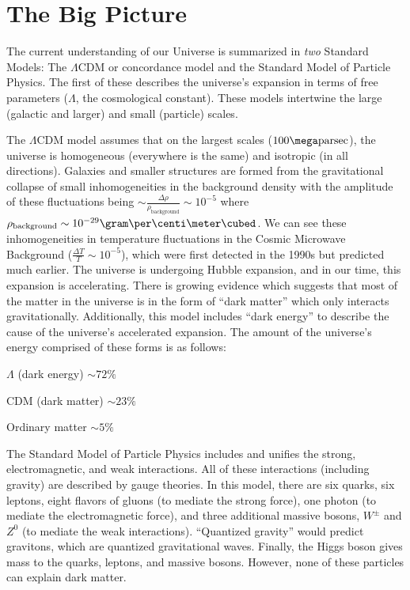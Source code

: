 \documentclass[a4paper,twoside,master.tex]{subfiles}
\begin{document}

\section{The Big Picture}\label{sec:the_big_picture}

The current understanding of our Universe is summarized in \textit{two} Standard Models: The $ \Lambda \text{CDM} $ or concordance model and the Standard Model of Particle Physics. The first of these describes the universe's expansion in terms of free parameters ($ \Lambda $, the cosmological constant). These models intertwine the large (galactic and larger) and small (particle) scales.

The $ \Lambda \text{CDM} $ model assumes that on the largest scales ($ 100\mega\text{parsec} $), the universe is homogeneous (everywhere is the same) and isotropic (in all directions). Galaxies and smaller structures are formed from the gravitational collapse of small inhomogeneities in the background density with the amplitude of these fluctuations being $ \sim \frac{\Delta \rho}{\rho_{\text{background}}} \sim 10^{-5} $ where $ \rho_{\text{background}} \sim 10^{-29} \gram\per\centi\meter\cubed $. We can see these inhomogeneities in temperature fluctuations in the Cosmic Microwave Background ($ \frac{\Delta T}{T} \sim 10^{-5} $), which were first detected in the 1990s but predicted much earlier. The universe is undergoing Hubble expansion, and in our time, this expansion is accelerating. There is growing evidence which suggests that most of the matter in the universe is in the form of ``dark matter'' which only interacts gravitationally. Additionally, this model includes ``dark energy'' to describe the cause of the universe's accelerated expansion. The amount of the universe's energy comprised of these forms is as follows:

$ \Lambda $ (dark energy) $ \sim 72\% $

CDM (dark matter) $ \sim 23\% $

Ordinary matter $ \sim 5\% $


The Standard Model of Particle Physics includes and unifies the strong, electromagnetic, and weak interactions. All of these interactions (including gravity) are described by gauge theories. In this model, there are six quarks, six leptons, eight flavors of gluons (to mediate the strong force), one photon (to mediate the electromagnetic force), and three additional massive bosons, $ W^{\pm} $ and $ Z^0 $ (to mediate the weak interactions). ``Quantized gravity'' would predict gravitons, which are quantized gravitational waves. Finally, the Higgs boson gives mass to the quarks, leptons, and massive bosons. However, none of these particles can explain dark matter.
\end{document}
